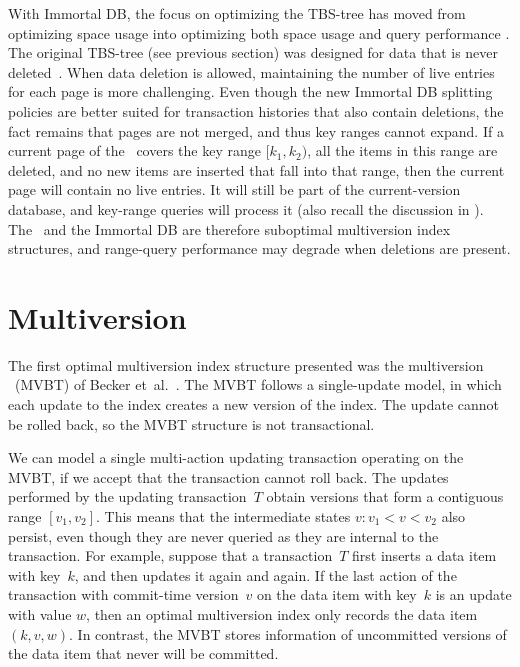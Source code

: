 With Immortal DB, the focus on optimizing the TBS-tree has moved from
optimizing space usage into optimizing both space usage and query
performance \cite{lomet:2009:improving,lomet:2008:version-compression}.  
The original TBS-tree (see previous section) was designed for data that is
never deleted~\cite{lomet:1989:tsb}.
When data deletion is allowed, maintaining the number of live entries for
each page is more challenging.
Even though the new Immortal DB splitting policies are better suited for
transaction histories that also contain deletions, the fact remains that pages
are not merged, and thus key ranges cannot expand.
If a current page of the \TSBtree\ covers the key range $[k_1, k_2)$, all
the items in this range are deleted, and no new items are inserted that fall
into that range, then the current page will contain no live entries.
It will still be part of the current-version database, and key-range queries
will process it (also recall the discussion in
). 
The \TSBtree\ and the Immortal DB are therefore suboptimal multiversion index
structures, and range-query performance may degrade when deletions are
present.



\section{Multiversion \Btree}
\label{sec:tsbmvbt:mvbt}
\label{def:mvbt}

The first optimal multiversion index structure
presented was the multiversion \Btree\ (MVBT) of Becker
et~al.~\cite{becker:1993:optimal,becker:1996:mvbt}.
The MVBT follows a single-update model, in which each update to
the index creates a new version of the index.
The update cannot be rolled back, so the MVBT structure is not transactional.

We can model a single multi-action updating transaction operating on
the MVBT, if we accept that the transaction cannot roll back. 
The updates performed by the updating transaction~$T$ obtain versions that
form a contiguous range $[v_1, v_2]$.
This means that the intermediate states $v: v_1 < v < v_2$ also
persist, even though they are never queried as they are internal to the
transaction. 
For example, suppose that a transaction~$T$ first inserts a data item
with key~$k$, and then updates it again and again.
If the last action of the transaction with commit-time version~$v$ on the
data item with key~$k$ is an update with value $w$, then an optimal
multiversion index only records the data item $(k, v, w)$.
In contrast, the MVBT stores information of uncommitted versions of the data
item that never will be committed.

